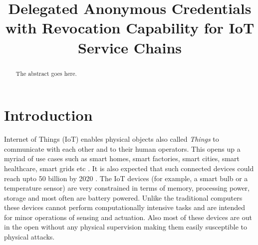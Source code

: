 \documentclass[journal]{IEEEtran}
\begin{document}
\title{Delegated Anonymous Credentials with Revocation Capability for IoT Service Chains}
\author{

}

\IEEEoverridecommandlockouts
{}

\maketitle

\begin{abstract}
The abstract goes here.
\end{abstract}

\begin{IEEEkeywords}

\end{IEEEkeywords}



\IEEEpeerreviewmaketitle



\section{Introduction} \label{introduction}

Internet of Things (IoT) enables physical objects also called \textit{Things}  to communicate with each other and to their human operators. This opens up a myriad of use cases such as smart homes, smart factories, smart cities, smart healthcare, smart grids etc \cite{IoT}. It is also expected that such connected devices could reach upto 50 billion by 2020 \cite{Evans}. The IoT devices (for example, a smart bulb or a temperature sensor) are very constrained in terms of memory, processing power, storage and most often are battery powered. Unlike the traditional computers these devices cannot perform computationally intensive tasks and are intended for minor operations of sensing and actuation. Also most of these devices are out in the open without any physical supervision making them easily susceptible to physical attacks.
\end{document}
